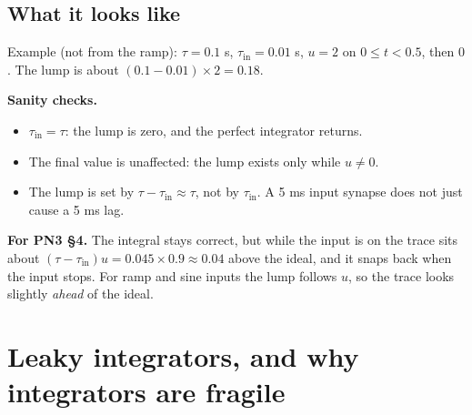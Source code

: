 \documentclass[11pt,letterpaper]{article}
\newcommand{\tin}{\tau_{\mathrm{in}}}
\begin{document}
\subsection*{What it looks like}

Example (not from the ramp): $\tau = 0.1$ s, $\tin = 0.01$ s, $u = 2$ on $0 \le t < 0.5$, then $0$. The lump is about $(0.1 - 0.01)\times 2 = 0.18$.
\begin{center}
\end{center}

\textbf{Sanity checks.}
\begin{itemize}
\item $\tin = \tau$: the lump is zero, and the perfect integrator returns.
\item The final value is unaffected: the lump exists only while $u \ne 0$.
\item The lump is set by $\tau - \tin \approx \tau$, not by $\tin$. A 5 ms input synapse does not just cause a 5 ms lag.
\end{itemize}

\textbf{For PN3 \S4.} The integral stays correct, but while the input is on the trace sits about $(\tau - \tin)u = 0.045 \times 0.9 \approx 0.04$ above the ideal, and it snaps back when the input stops. For ramp and sine inputs the lump follows $u$, so the trace looks slightly \emph{ahead} of the ideal.

\section{Leaky integrators, and why integrators are fragile}
\end{document}
